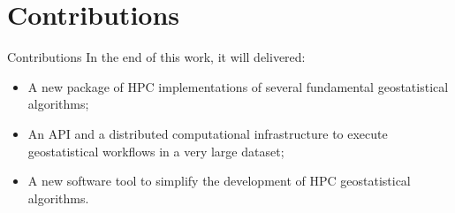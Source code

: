\section{Contributions}
\begin{frame}{Contributions}
	In the end of this work, it will delivered:
    \begin{itemize}
    	\item A new package of HPC implementations of several fundamental geostatistical algorithms;
        \item An API and a distributed computational infrastructure to execute geostatistical workflows in a very large dataset;
        \item A new software tool to simplify the development of HPC geostatistical algorithms. 
    \end{itemize}
\end{frame}




